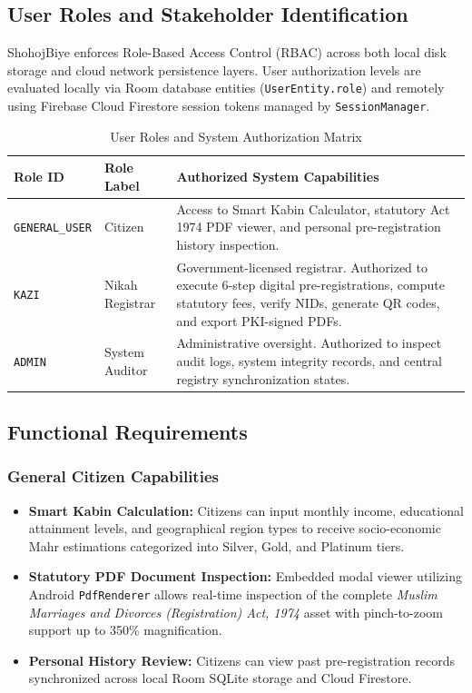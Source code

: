 \documentclass[12pt,a4paper]{article}
\begin{document}
	\subsection{User Roles and Stakeholder Identification}
	ShohojBiye enforces Role-Based Access Control (RBAC) across both local disk storage and cloud network persistence layers. User authorization levels are evaluated locally via Room database entities (\texttt{UserEntity.role}) and remotely using Firebase Cloud Firestore session tokens managed by \texttt{SessionManager}.
	
	\begin{table}[h!]
		\centering
		\small
		\caption{User Roles and System Authorization Matrix}
		\label{tab:user_roles}
		\begin{tabularx}{\textwidth}{@{}l l L@{}}
			\toprule
			\textbf{Role ID} & \textbf{Role Label} & \textbf{Authorized System Capabilities} \\ \midrule
			\texttt{GENERAL\_USER} & Citizen & Access to Smart Kabin Calculator, statutory Act 1974 PDF viewer, and personal pre-registration history inspection. \\ \addlinespace
			\texttt{KAZI} & Nikah Registrar & Government-licensed registrar. Authorized to execute 6-step digital pre-registrations, compute statutory fees, verify NIDs, generate QR codes, and export PKI-signed PDFs. \\ \addlinespace
			\texttt{ADMIN} & System Auditor & Administrative oversight. Authorized to inspect audit logs, system integrity records, and central registry synchronization states. \\ \bottomrule
		\end{tabularx}
	\end{table}
	
	\subsection{Functional Requirements}
	
	\subsubsection{General Citizen Capabilities}
	\begin{itemize}
		\item \textbf{Smart Kabin Calculation:} Citizens can input monthly income, educational attainment levels, and geographical region types to receive socio-economic Mahr estimations categorized into Silver, Gold, and Platinum tiers.
		\item \textbf{Statutory PDF Document Inspection:} Embedded modal viewer utilizing Android \texttt{PdfRenderer} allows real-time inspection of the complete \textit{Muslim Marriages and Divorces (Registration) Act, 1974} asset with pinch-to-zoom support up to 350\% magnification.
		\item \textbf{Personal History Review:} Citizens can view past pre-registration records synchronized across local Room SQLite storage and Cloud Firestore.
	\end{itemize}
	
\end{document}
